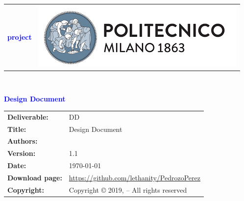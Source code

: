




\begin{titlepage}



{\begin{table}[t!]
\centering
\begin{tabu} to \textwidth { X[1.3,r,p] X[1.7,l,p] }
\textcolor{Blue}
{\textbf{\small{\projectName{} project \newline \names{}}}} & \includegraphics[scale=0.5]{Images/PolimiLogo}
\end{tabu}
\end{table}}~\\ [7cm]


\begin{flushleft}

{\textcolor{Blue}{\textbf{\Huge{Design
        Document}}}} \\ [1cm]

\end{flushleft}

\end{titlepage}

\begin{table}[h!]
\begin{tabu} to \textwidth { X[0.3,r,p] X[0.7,l,p] }
\hline

\textbf{Deliverable:} & DD\\
\textbf{Title:} & Design Document \\
\textbf{Authors:} & \names{} \\
\textbf{Version:} & 1.1 \\ 
\textbf{Date:} & \today \\
\textbf{Download page:} & \url{https://github.com/lethanity/PedrozoPerez} \\
\textbf{Copyright:} & Copyright © 2019, \names{}  – All rights reserved \\
\hline
\end{tabu}
\end{table}




